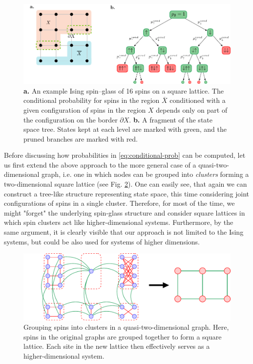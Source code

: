 \begin{figure}
  \centering
  \includegraphics[width=\textwidth]{figures/squarelattice.pdf}
  \caption{\textbf{a.} An example Ising spin--glass  of 16 spins on a square lattice. The conditional probability for spins in the region $\overline{X}$ conditioned with a given configuration of spins in the region $X$ depends only on part of the configuration on the border $\partial X$. \textbf{b.} A fragment of the state space tree. States kept at each
    level are marked with green, and the pruned branches are marked with red.}
  \label{fig:lattice-and-border}
\end{figure}

Before discussing how probabilities in \eqref{eq:conditional-prob} can be
computed, let us first extend the above approach to the more general case of a
quasi-two-dimensional graph, i.e. one in which nodes can be grouped into
\emph{clusters} forming a two-dimensional square lattice (see Fig.
\ref{fig:clustering}). One can easily see, that again we can construct a
tree-like structure representing state space, this time considering joint
configurations of spins in a single cluster. Therefore, for most of the
time, we might "forget" the underlying spin-glass structure and consider square
lattices in which spin clusters act like higher-dimensional systems. Furthermore,
by the same argument, it is clearly visible that our approach is not limited
to the Ising systems, but could be also used for systems of higher dimensions.

\begin{figure}
  \includegraphics[width=\textwidth]{figures/clustering}
  \caption{Grouping spins into clusters in a quasi-two-dimensional graph. Here, spins in
    the original graphs are grouped together to form a square lattice. Each site in
    the new lattice then effectively serves as a higher-dimensional system.}
  \label{fig:clustering}
\end{figure}

